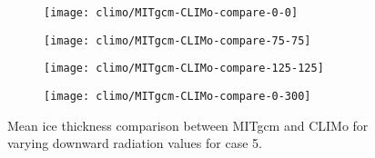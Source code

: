\documentclass[11pt]{article}
\begin{document}
\begin{figure}[h!]
\begin{subfigure}{0.475\linewidth}
\texttt{[image: climo/MITgcm-CLIMo-compare-0-0]}
\end{subfigure}
\begin{subfigure}{0.475\linewidth}
\texttt{[image: climo/MITgcm-CLIMo-compare-75-75]}
\end{subfigure}

\begin{subfigure}{0.475\linewidth}
\texttt{[image: climo/MITgcm-CLIMo-compare-125-125]}
\end{subfigure}
\begin{subfigure}{0.475\linewidth}
\texttt{[image: climo/MITgcm-CLIMo-compare-0-300]}
\end{subfigure}
\caption{Mean ice thickness comparison between MITgcm and CLIMo for varying downward radiation values for case 5.}
\label{fig:CLIMoCompare}
\end{figure}
\end{document}
